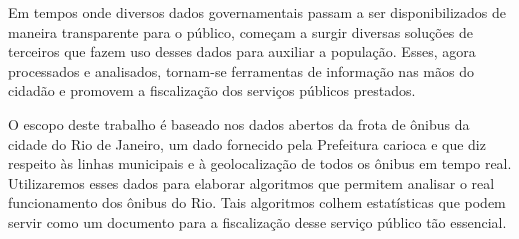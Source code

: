 Em tempos onde diversos dados governamentais passam a ser disponibilizados de maneira transparente para o público, começam a surgir diversas soluções de terceiros que fazem uso desses dados para auxiliar a população. Esses, agora processados e analisados, tornam-se ferramentas de informação nas mãos do cidadão e promovem a fiscalização dos serviços públicos prestados.

O escopo deste trabalho é baseado nos dados abertos da frota de ônibus da cidade do Rio de Janeiro, um dado fornecido pela Prefeitura carioca e que diz respeito às linhas municipais e à geolocalização de todos os ônibus em tempo real. Utilizaremos esses dados para elaborar algoritmos que permitem analisar o real funcionamento dos ônibus do Rio. Tais algoritmos colhem estatísticas que podem servir como um documento para a fiscalização desse serviço público tão essencial.
